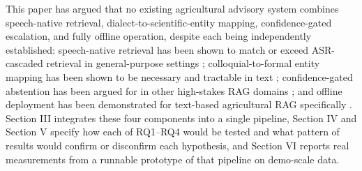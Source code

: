 \documentclass[conference]{IEEEtran}
\begin{document}
This paper has argued that no existing agricultural advisory system combines speech-native retrieval, dialect-to-scientific-entity mapping, confidence-gated escalation, and fully offline operation, despite each being independently established: speech-native retrieval has been shown to match or exceed ASR-cascaded retrieval in general-purpose settings \cite{min2025speechrag,google2025s2r}; colloquial-to-formal entity mapping has been shown to be necessary and tractable in text \cite{liu2025colloquialpest,hossain2026bengalirag}; confidence-gated abstention has been argued for in other high-stakes RAG domains \cite{abstinence2025}; and offline deployment has been demonstrated for text-based agricultural RAG specifically \cite{dubey2025aahar,hossain2026bengalirag}. Section III integrates these four components into a single pipeline, Section IV and Section V specify how each of RQ1--RQ4 would be tested and what pattern of results would confirm or disconfirm each hypothesis, and Section VI reports real measurements from a runnable prototype of that pipeline on demo-scale data.
\end{document}
